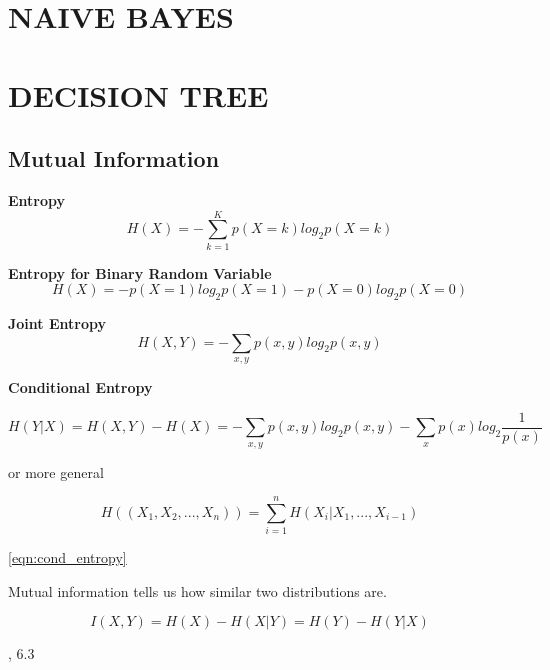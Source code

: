 \documentclass[8pt,letterpaper]{book}
\begin{document}
\chapter{NAIVE BAYES}

\chapter{DECISION TREE}
\section{Mutual Information}
\textbf{Entropy}
\begin{equation}\label{eqn:entropy}
    H(X) = -\sum_{k=1}^{K} p(X=k) log_2 p(X=k)
\end{equation}

\textbf{Entropy for Binary Random Variable}
\begin{equation}\label{eqn:binary_entropy}
    H(X) = -p(X=1)log_2 p(X=1) - p(X=0)log_2 p(X=0)
\end{equation}


\textbf{Joint Entropy}
\begin{equation}\label{eqn:joint_entropy}
    H(X,Y) = -\sum_{x,y} p(x,y) log_2 p(x,y)
\end{equation}

\textbf{Conditional Entropy}

\begin{equation}\label{eqn:cond_entropy}
    H(Y|X) = H(X,Y) - H(X)
    = -\sum_{x,y} p(x,y) log_2 p(x,y) -\sum_{x} p(x) log_2 \frac{1}{p(x)}
\end{equation}

or more general

\begin{equation}\label{eqn:cond_entropy_general}
    H((X_1,X_2,...,X_n)) = \sum_{i=1}^{n} H(X_i | X_1,...,X_{i-1})
\end{equation}

\eqref{eqn:cond_entropy}

Mutual information tells us how similar two distributions are.

\begin{equation}\label{eqn:mutual_information}
    I(X,Y) = H(X) - H(X|Y) = H(Y) - H(Y|X)
\end{equation}

\cite{Murphy22}, 6.3 \newline
\end{document}
